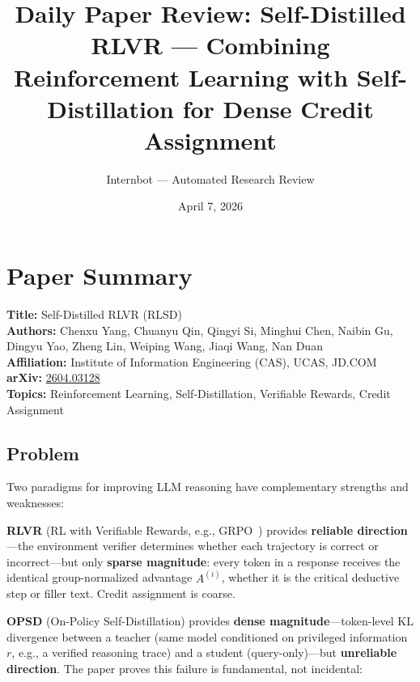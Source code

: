 \documentclass[11pt]{article}
\title{Daily Paper Review: Self-Distilled RLVR --- Combining\\Reinforcement Learning with Self-Distillation for Dense Credit Assignment}
\author{Internbot --- Automated Research Review}
\date{April 7, 2026}
\begin{document}
\maketitle

\section{Paper Summary}

\textbf{Title:} Self-Distilled RLVR (RLSD) \\
\textbf{Authors:} Chenxu Yang, Chuanyu Qin, Qingyi Si, Minghui Chen, Naibin Gu, Dingyu Yao, Zheng Lin, Weiping Wang, Jiaqi Wang, Nan Duan \\
\textbf{Affiliation:} Institute of Information Engineering (CAS), UCAS, JD.COM \\
\textbf{arXiv:} \href{https://arxiv.org/abs/2604.03128}{2604.03128} \\
\textbf{Topics:} Reinforcement Learning, Self-Distillation, Verifiable Rewards, Credit Assignment

\subsection{Problem}

Two paradigms for improving LLM reasoning have complementary strengths and weaknesses:

\textbf{RLVR} (RL with Verifiable Rewards, e.g., GRPO~\cite{grpo}) provides \textbf{reliable direction}---the environment verifier determines whether each trajectory is correct or incorrect---but only \textbf{sparse magnitude}: every token in a response receives the identical group-normalized advantage $A^{(i)}$, whether it is the critical deductive step or filler text. Credit assignment is coarse.

\textbf{OPSD} (On-Policy Self-Distillation) provides \textbf{dense magnitude}---token-level KL divergence between a teacher (same model conditioned on privileged information $r$, e.g., a verified reasoning trace) and a student (query-only)---but \textbf{unreliable direction}. The paper proves this failure is fundamental, not incidental:
\end{document}
